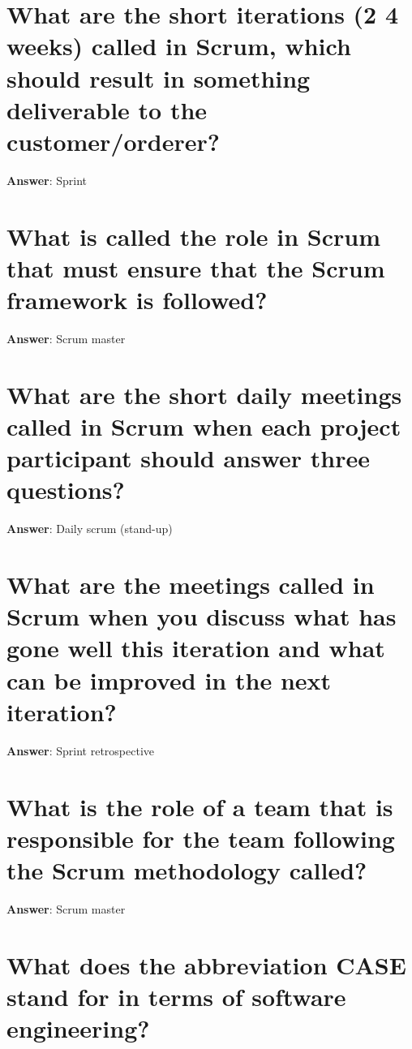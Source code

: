 \documentclass[a4paper,11pt,oneside]{book}
\begin{document}
\begin{sloppypar}
\section{What are the short iterations (2 {\textendash} 4 weeks) called in Scrum, which should result in something deliverable to the customer/orderer?}

\label{q:42:sa:en:True}

\textbf{Answer}: Sprint



\section{What is called the role in Scrum that must ensure that the Scrum framework is followed?}

\label{q:43:sa:en:True}

\textbf{Answer}: Scrum master



\section{What are the short daily meetings called in Scrum when each project participant should answer three questions?}

\label{q:44:sa:en:True}

\textbf{Answer}: Daily scrum (stand-up)



\section{What are the meetings called in Scrum when you discuss what has gone well this iteration and what can be improved in the next iteration?}

\label{q:45:sa:en:True}

\textbf{Answer}: Sprint retrospective



\section{What is the role of a team that is responsible for the team following the Scrum methodology called?}

\label{q:46:sa:en:True}

\textbf{Answer}: Scrum master



\section{What does the abbreviation CASE stand for in terms of software engineering?}


\end{sloppypar}
\end{document}

